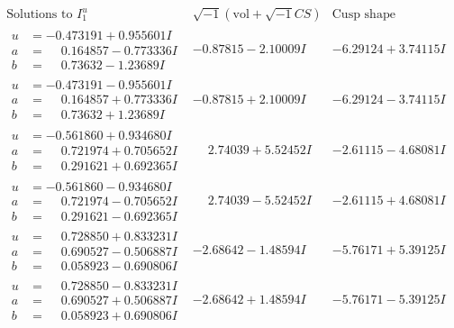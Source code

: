 \documentclass[1p]{elsarticle_modified}
\theoremstyle{definition}
\newcommand{\I}{\sqrt{-1}}
\begin{document}
$$\begin{array}{c|c|c}  
\text{Solutions to }I^u_{1}& \I (\text{vol} + \sqrt{-1}CS) & \text{Cusp shape}\\
 \hline 
\begin{aligned}
u &= -0.473191 + 0.955601 I \\
a &= \phantom{-}0.164857 - 0.773336 I \\
b &= \phantom{-}0.73632 - 1.23689 I\end{aligned}
 & -0.87815 - 2.10009 I & -6.29124 + 3.74115 I \\ \hline\begin{aligned}
u &= -0.473191 - 0.955601 I \\
a &= \phantom{-}0.164857 + 0.773336 I \\
b &= \phantom{-}0.73632 + 1.23689 I\end{aligned}
 & -0.87815 + 2.10009 I & -6.29124 - 3.74115 I \\ \hline\begin{aligned}
u &= -0.561860 + 0.934680 I \\
a &= \phantom{-}0.721974 + 0.705652 I \\
b &= \phantom{-}0.291621 + 0.692365 I\end{aligned}
 & \phantom{-}2.74039 + 5.52452 I & -2.61115 - 4.68081 I \\ \hline\begin{aligned}
u &= -0.561860 - 0.934680 I \\
a &= \phantom{-}0.721974 - 0.705652 I \\
b &= \phantom{-}0.291621 - 0.692365 I\end{aligned}
 & \phantom{-}2.74039 - 5.52452 I & -2.61115 + 4.68081 I \\ \hline\begin{aligned}
u &= \phantom{-}0.728850 + 0.833231 I \\
a &= \phantom{-}0.690527 - 0.506887 I \\
b &= \phantom{-}0.058923 - 0.690806 I\end{aligned}
 & -2.68642 - 1.48594 I & -5.76171 + 5.39125 I \\ \hline\begin{aligned}
u &= \phantom{-}0.728850 - 0.833231 I \\
a &= \phantom{-}0.690527 + 0.506887 I \\
b &= \phantom{-}0.058923 + 0.690806 I\end{aligned}
 & -2.68642 + 1.48594 I & -5.76171 - 5.39125 I \\ \hline\begin{aligned}

\end{aligned}
\end{array}$$
\end{document}
